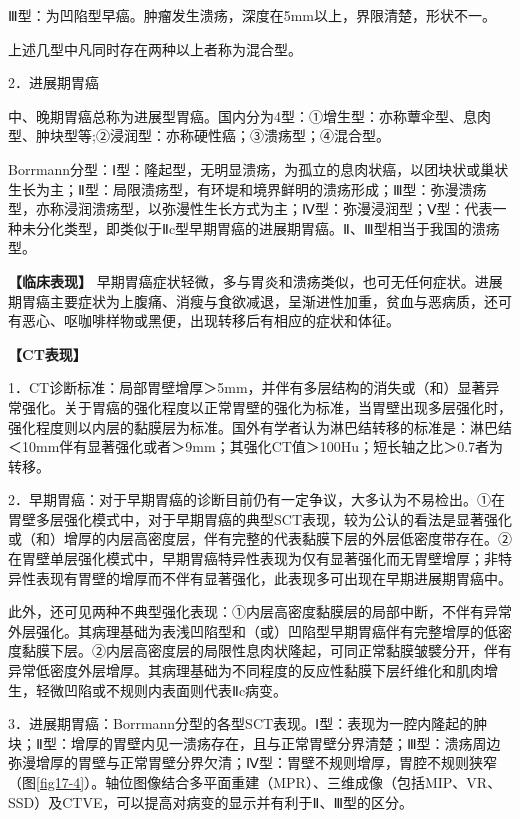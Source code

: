 Ⅲ型：为凹陷型早癌。肿瘤发生溃疡，深度在5mm以上，界限清楚，形状不一。

上述几型中凡同时存在两种以上者称为混合型。

2．进展期胃癌

中、晚期胃癌总称为进展型胃癌。国内分为4型：①增生型：亦称蕈伞型、息肉型、肿块型等;②浸润型：亦称硬性癌；③溃疡型；④混合型。

Borrmann分型：Ⅰ型：隆起型，无明显溃疡，为孤立的息肉状癌，以团块状或巢状生长为主；Ⅱ型：局限溃疡型，有环堤和境界鲜明的溃疡形成；Ⅲ型：弥漫溃疡型，亦称浸润溃疡型，以弥漫性生长方式为主；Ⅳ型：弥漫浸润型；Ⅴ型：代表一种未分化类型，即类似于Ⅱc型早期胃癌的进展期胃癌。Ⅱ、Ⅲ型相当于我国的溃疡型。

\textbf{【临床表现】}
早期胃癌症状轻微，多与胃炎和溃疡类似，也可无任何症状。进展期胃癌主要症状为上腹痛、消瘦与食欲减退，呈渐进性加重，贫血与恶病质，还可有恶心、呕咖啡样物或黑便，出现转移后有相应的症状和体征。

\textbf{【CT表现】}

1．CT诊断标准：局部胃壁增厚＞5mm，并伴有多层结构的消失或（和）显著异常强化。关于胃癌的强化程度以正常胃壁的强化为标准，当胃壁出现多层强化时，强化程度则以内层的黏膜层为标准。国外有学者认为淋巴结转移的标准是：淋巴结＜10mm伴有显著强化或者＞9mm；其强化CT值＞100Hu；短长轴之比＞0.7者为转移。

2．早期胃癌：对于早期胃癌的诊断目前仍有一定争议，大多认为不易检出。①在胃壁多层强化模式中，对于早期胃癌的典型SCT表现，较为公认的看法是显著强化或（和）增厚的内层高密度层，伴有完整的代表黏膜下层的外层低密度带存在。②在胃壁单层强化模式中，早期胃癌特异性表现为仅有显著强化而无胃壁增厚；非特异性表现有胃壁的增厚而不伴有显著强化，此表现多可出现在早期进展期胃癌中。

此外，还可见两种不典型强化表现：①内层高密度黏膜层的局部中断，不伴有异常外层强化。其病理基础为表浅凹陷型和（或）凹陷型早期胃癌伴有完整增厚的低密度黏膜下层。②内层高密度层的局限性息肉状隆起，可同正常黏膜皱襞分开，伴有异常低密度外层增厚。其病理基础为不同程度的反应性黏膜下层纤维化和肌肉增生，轻微凹陷或不规则内表面则代表Ⅱc病变。

3．进展期胃癌：Borrmann分型的各型SCT表现。Ⅰ型：表现为一腔内隆起的肿块；Ⅱ型：增厚的胃壁内见一溃疡存在，且与正常胃壁分界清楚；Ⅲ型：溃疡周边弥漫增厚的胃壁与正常胃壁分界欠清；Ⅳ型：胃壁不规则增厚，胃腔不规则狭窄（图\ref{fig17-4}）。轴位图像结合多平面重建（MPR）、三维成像（包括MIP、VR、SSD）及CTVE，可以提高对病变的显示并有利于Ⅱ、Ⅲ型的区分。

